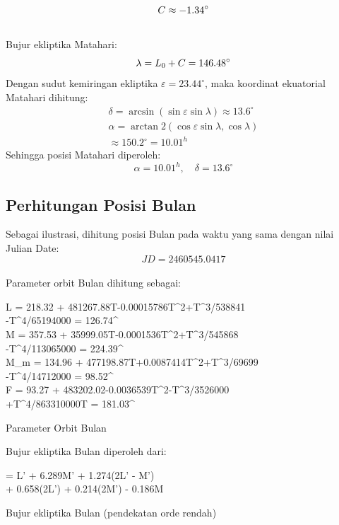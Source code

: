 {\setlength{\abovedisplayskip}{8pt}%
	\setlength{\belowdisplayskip}{8pt}%
\[
C \approx -1.34^\circ\\
\]
}\\
Bujur ekliptika Matahari:
{\setlength{\abovedisplayskip}{8pt}%
	\setlength{\belowdisplayskip}{8pt}%
\[
\lambda = L_0 + C = 146.48^\circ\\
\]
}
Dengan sudut kemiringan ekliptika $\varepsilon = 23.44^\circ$, maka koordinat ekuatorial Matahari dihitung:
{\setlength{\abovedisplayskip}{8pt}%
	\setlength{\belowdisplayskip}{8pt}%
\[
\begin{split}
\delta = \arcsin(\sin\varepsilon \sin\lambda) \approx 13.6^\circ \\
\alpha = \arctan2(\cos\varepsilon \sin\lambda,\cos\lambda) \\
\approx 150.2^\circ = 10.01^h
\end{split}
\]
}
Sehingga posisi Matahari diperoleh:
{\setlength{\abovedisplayskip}{8pt}%
	\setlength{\belowdisplayskip}{8pt}%
\[
\alpha = 10.01^h,\quad \delta = 13.6^\circ
\]
}
\subsection{Perhitungan Posisi Bulan}
\label{III.ContohBulan}

Sebagai ilustrasi, dihitung posisi Bulan pada waktu yang sama dengan nilai Julian Date:\\
{\setlength{\abovedisplayskip}{8pt}%
	\setlength{\belowdisplayskip}{8pt}%
\[
JD = 2460545.0417
\]
}\\
Parameter orbit Bulan dihitung sebagai:
\begin{equationcaptioned}[eq:3.parameterOrbitBulan]{
		\begin{split}
			L = 218.32 + 481267.88T-0.00015786T^2+T^3/538841 \\-T^4/65194000 = 126.74^\circ\\
			M = 357.53 + 35999.05T-0.0001536T^2+T^3/545868\\-T^4/113065000 = 224.39^\circ\\
			M_m = 134.96 + 477198.87T+0.0087414T^2+T^3/69699\\-T^4/14712000 = 98.52^\circ\\
			F = 93.27 + 483202.02-0.0036539T^2-T^3/3526000\\+T^4/863310000T = 181.03^\circ
		\end{split}
	}{
		Parameter Orbit Bulan 
	}
\end{equationcaptioned}

Bujur ekliptika Bulan diperoleh dari:
\begin{equationcaptioned}[eq:3.bujurEkliptikaBulan]{
	\begin{split}
	\lambda =
L'
+ 6.289\sin M'
+ 1.274\sin(2L' - M')\\
+ 0.658\sin(2L')
+ 0.214\sin(2M')
- 0.186\sin M
	\end{split}
	}{
		Bujur ekliptika Bulan (pendekatan orde rendah)
	}
\end{equationcaptioned}


